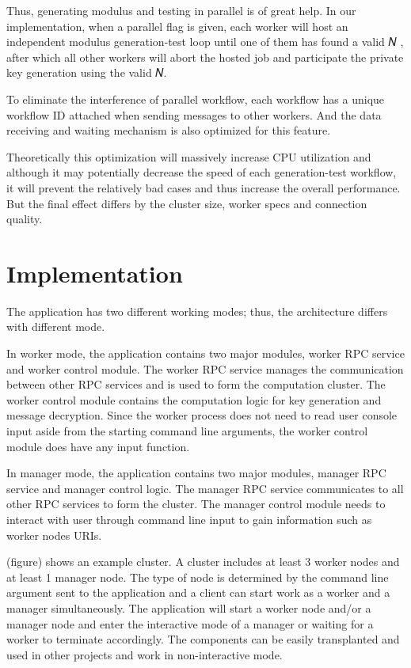 Thus, generating modulus and testing in parallel is of great help. In our implementation, when a parallel flag is given, each worker will host an independent modulus generation-test loop until one of them has found a valid 𝑁 , after which all other workers will abort the hosted job and participate the private key generation using the valid 𝑁.

To eliminate the interference of parallel workflow, each workflow has a unique workflow ID attached when sending messages to other workers. And the data receiving and waiting mechanism is also optimized for this feature.

Theoretically this optimization will massively increase CPU utilization and although it may potentially decrease the speed of each generation-test workflow, it will prevent the relatively bad cases and thus increase the overall performance. But the final effect differs by the cluster size, worker specs and connection quality.

\section{Implementation}

The application has two different working modes; thus, the architecture differs with different mode.

In worker mode, the application contains two major modules, worker RPC service and worker control module. The worker RPC service manages the communication between other RPC services and is used to form the computation cluster. The worker control module contains the computation logic for key generation and message decryption. Since the worker process does not need to read user console input aside from the starting command line arguments, the worker control module does have any input function.

In manager mode, the application contains two major modules, manager RPC service and manager control logic. The manager RPC service communicates to all other RPC services to form the cluster. The manager control module needs to interact with user through command line input to gain information such as worker nodes URIs.

(figure) shows an example cluster. A cluster includes at least 3 worker nodes and at least 1 manager node. The type of node is determined by the command line argument sent to the application and a client can start work as a worker and a manager simultaneously. The application will start a worker node and/or a manager node and enter the interactive mode of a manager or waiting for a worker to terminate accordingly. The components can be easily transplanted and used in other projects and work in non-interactive mode.

